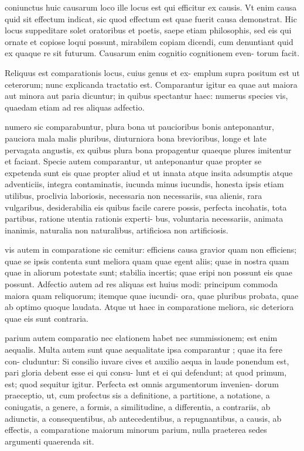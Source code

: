  coniunctus huic causarum loco ille locus est qui efficitur ex causis. Vt enim causa quid sit effectum indicat, sic quod effectum est quae fuerit causa demonstrat. Hic locus suppeditare solet oratoribus et poetis, saepe etiam philosophis, sed eis qui ornate et copiose loqui possunt, mirabilem copiam dicendi, cum denuntiant quid ex quaque re sit futurum. Causarum enim cognitio cognitionem even- torum facit.

 Reliquus est comparationis locus, cuius genus et ex- emplum supra positum est ut ceterorum; nunc explicanda tractatio est. Comparantur igitur ea quae aut maiora aut minora aut paria dicuntur; in quibus spectantur haec: numerus species vis, quaedam etiam ad res aliquas adfectio.

 numero sic comparabuntur, plura bona ut paucioribus bonis anteponantur, pauciora mala malis pluribus, diuturniora bona brevioribus, longe et late pervagata angustis, ex quibus plura bona propagentur quaeque plures imitentur et faciant. Specie autem comparantur, ut anteponantur quae propter se expetenda sunt eis quae propter aliud et ut innata atque insita adsumptis atque adventiciis, integra contaminatis, iucunda minus iucundis, honesta ipsis etiam utilibus, proclivia laboriosis, necessaria non necessariis, sua alienis, rara vulgaribus, desiderabilia eis quibus facile carere possis, perfecta incohatis, tota partibus, ratione utentia rationis experti- bus, voluntaria necessariis, animata inanimis, naturalia non naturalibus, artificiosa non artificiosis.

 vis autem in comparatione sic cemitur: efficiens causa gravior quam non efficiens; quae se ipsis contenta sunt meliora quam quae egent aliis; quae in nostra quam quae in aliorum potestate sunt; stabilia incertis; quae eripi non possunt eis quae possunt. Adfectio autem ad res aliquas est huius modi: principum commoda maiora quam reliquorum; itemque quae iucundi- ora, quae pluribus probata, quae ab optimo quoque laudata. Atque ut haec in comparatione meliora, sic deteriora quae eis sunt contraria.

 parium autem comparatio nec elationem habet nec summissionem; est enim aequalis. Multa autem sunt quae aequalitate ipsa comparantur ; quae ita fere con- cluduntur: Si consilio iuvare cives et auxilio aequa in laude ponendum est, pari gloria debent esse ei qui consu- lunt et ei qui defendunt; at quod primum, est; quod sequitur igitur. Perfecta est omnis argumentorum invenien- dorum praeceptio, ut, cum profectus sis a definitione, a partitione, a notatione, a coniugatis, a genere, a formis, a similitudine, a differentia, a contrariis, ab adiunctis, a consequentibus, ab antecedentibus, a repugnantibus, a causis, ab effectis, a comparatione maiorum minorum parium, nulla praeterea sedes argumenti quaerenda sit.

